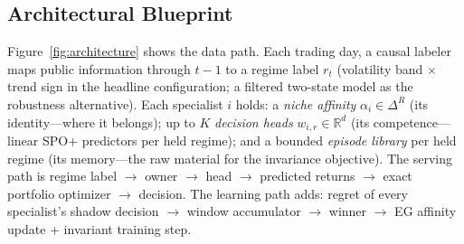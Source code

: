 \documentclass[10pt]{article}
\begin{document}
\subsection{Architectural Blueprint}

Figure~\ref{fig:architecture} shows the data path. Each trading day, a
causal labeler maps public information through $t-1$ to a regime label
$r_t$ (volatility band $\times$ trend sign in the headline configuration;
a filtered two-state model as the robustness alternative). Each
specialist $i$ holds: a \emph{niche affinity} $\alpha_i \in \Delta^R$
(its identity---where it belongs); up to $K$ \emph{decision heads}
$w_{i,r} \in \mathbb{R}^d$ (its competence---linear SPO+ predictors per
held regime); and a bounded \emph{episode library} per held regime (its
memory---the raw material for the invariance objective). The serving path
is regime label $\to$ owner $\to$ head $\to$ predicted returns $\to$
exact portfolio optimizer $\to$ decision. The learning path adds: regret
of every specialist's shadow decision $\to$ window accumulator $\to$
winner $\to$ EG affinity update + invariant training step.
\end{document}
